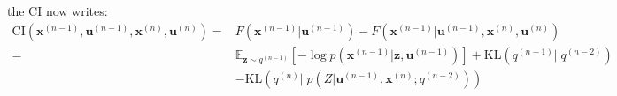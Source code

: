 \documentclass[12pt,twoside,openright]{article}
\begin{document}
the CI now writes:
\begin{align}
	\text{CI}(\boldsymbol{x}^{(n-1)},\boldsymbol{u}^{(n-1)}, \boldsymbol{x}^{(n)}, \boldsymbol{u}^{(n)}) =& F(\boldsymbol{x}^{(n-1)}|\boldsymbol{u}^{(n-1)}) - F(\boldsymbol{x}^{(n-1)}|\boldsymbol{u}^{(n-1)}, \boldsymbol{x}^{(n)}, \boldsymbol{u}^{(n)}) \nonumber\\
	=& \mathbb{E}_{\boldsymbol{z} \sim q^{(n-1)}} \left[-\log p(\boldsymbol{x}^{(n-1)}| \boldsymbol{z}, \boldsymbol{u}^{(n-1)})\right] +
	 \text{KL}(q^{(n-1)}||q^{(n-2)}) \nonumber\\
	& - \text{KL}(q^{(n)}||p(Z|\boldsymbol{u}^{(n-1)}, \boldsymbol{x}^{(n)}; q^{(n-2)}))\nonumber
\end{align}	
\end{document}
